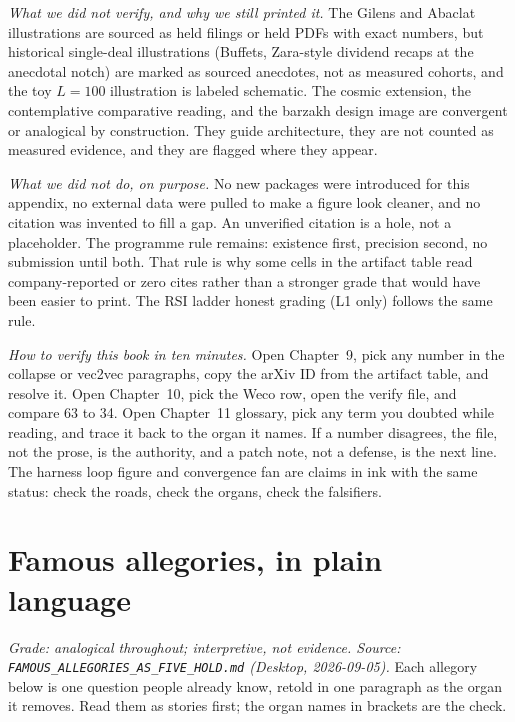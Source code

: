 \textit{What we did not verify, and why we still printed it.} The Gilens and Abaclat illustrations are sourced as held filings or held PDFs with exact numbers, but historical single-deal illustrations (Buffets, Zara-style dividend recaps at the anecdotal notch) are marked as sourced anecdotes, not as measured cohorts, and the toy $L=100$ illustration is labeled schematic. The cosmic extension, the contemplative comparative reading, and the barzakh design image are convergent or analogical by construction. They guide architecture, they are not counted as measured evidence, and they are flagged where they appear.

\textit{What we did not do, on purpose.} No new packages were introduced for this appendix, no external data were pulled to make a figure look cleaner, and no citation was invented to fill a gap. An unverified citation is a hole, not a placeholder. The programme rule remains: existence first, precision second, no submission until both. That rule is why some cells in the artifact table read company-reported or zero cites rather than a stronger grade that would have been easier to print. The RSI ladder honest grading (L1 only) follows the same rule.

\textit{How to verify this book in ten minutes.} Open Chapter~9, pick any number in the collapse or vec2vec paragraphs, copy the arXiv ID from the artifact table, and resolve it. Open Chapter~10, pick the Weco row, open the verify file, and compare 63 to 34. Open Chapter~11 glossary, pick any term you doubted while reading, and trace it back to the organ it names. If a number disagrees, the file, not the prose, is the authority, and a patch note, not a defense, is the next line. The harness loop figure and convergence fan are claims in ink with the same status: check the roads, check the organs, check the falsifiers.

\section{Famous allegories, in plain language}
\label{sec:appendix-allegories}

\textit{Grade: analogical throughout; interpretive, not evidence. Source: \texttt{FAMOUS\_ALLEGORIES\_AS\_FIVE\_HOLD.md} (Desktop, 2026-09-05).} Each allegory below is one question people already know, retold in one paragraph as the organ it removes. Read them as stories first; the organ names in brackets are the check.

